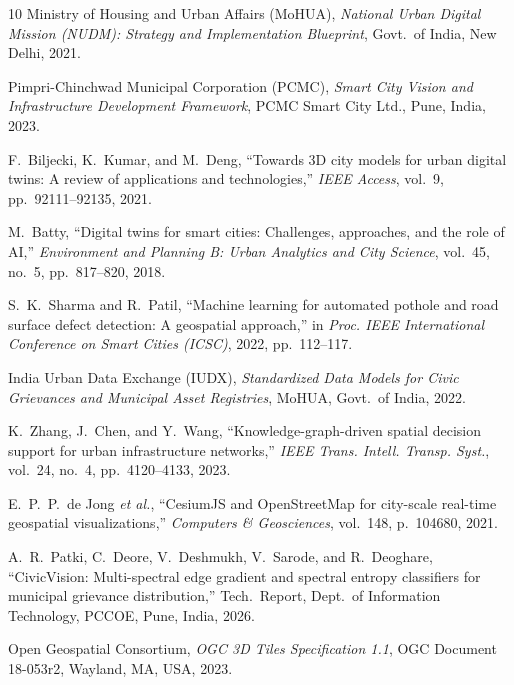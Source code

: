 \documentclass[12pt,a4paper]{report}
\begin{document}
\newpage
\begin{thebibliography}{10}
Ministry of Housing and Urban Affairs (MoHUA), \emph{National Urban Digital Mission (NUDM): Strategy and Implementation Blueprint}, Govt.\ of India, New Delhi, 2021.

Pimpri-Chinchwad Municipal Corporation (PCMC), \emph{Smart City Vision and Infrastructure Development Framework}, PCMC Smart City Ltd., Pune, India, 2023.

F.~Biljecki, K.~Kumar, and M.~Deng, ``Towards 3D city models for urban digital twins: A review of applications and technologies,'' \emph{IEEE Access}, vol.~9, pp.~92111--92135, 2021.

M.~Batty, ``Digital twins for smart cities: Challenges, approaches, and the role of AI,'' \emph{Environment and Planning B: Urban Analytics and City Science}, vol.~45, no.~5, pp.~817--820, 2018.

S.~K.~Sharma and R.~Patil, ``Machine learning for automated pothole and road surface defect detection: A geospatial approach,'' in \emph{Proc. IEEE International Conference on Smart Cities (ICSC)}, 2022, pp.~112--117.

India Urban Data Exchange (IUDX), \emph{Standardized Data Models for Civic Grievances and Municipal Asset Registries}, MoHUA, Govt.\ of India, 2022.

K.~Zhang, J.~Chen, and Y.~Wang, ``Knowledge-graph-driven spatial decision support for urban infrastructure networks,'' \emph{IEEE Trans. Intell. Transp. Syst.}, vol.~24, no.~4, pp.~4120--4133, 2023.

E.~P.~P.~de Jong \emph{et al.}, ``CesiumJS and OpenStreetMap for city-scale real-time geospatial visualizations,'' \emph{Computers \& Geosciences}, vol.~148, p.~104680, 2021.

A.~R.~Patki, C.~Deore, V.~Deshmukh, V.~Sarode, and R.~Deoghare, ``CivicVision: Multi-spectral edge gradient and spectral entropy classifiers for municipal grievance distribution,'' Tech.\ Report, Dept.\ of Information Technology, PCCOE, Pune, India, 2026.

Open Geospatial Consortium, \emph{OGC 3D Tiles Specification 1.1}, OGC Document 18-053r2, Wayland, MA, USA, 2023.
\end{thebibliography}
\end{document}
